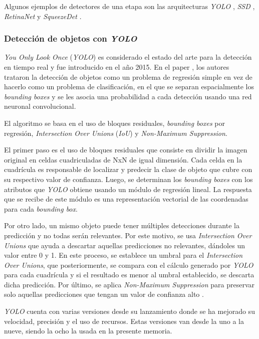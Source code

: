 Algunos ejemplos de detectores de una etapa son las arquitecturas \textit{YOLO} \cite{ARTICLE:13}, \textit{SSD} \cite{ARTICLE:14}, \textit{RetinaNet} \cite{ARTICLE:15} y \textit{SqueezeDet} \cite{ARTICLE:16}. 

\subsubsection{Detección de objetos con \textit{YOLO}}

\textit{You Only Look Once} (\textit{YOLO}) es considerado el estado del arte para la detección en tiempo real y fue introducido en el año 2015. En el paper \cite{ARTICLE:13}, los autores trataron la detección de objetos como un problema de regresión simple en vez de hacerlo como un problema de clasificación, en el que se separan espacialmente los \textit{bounding boxes} y se les asocia una probabilidad a cada detección usando una red neuronal convolucional.

El algoritmo se basa en el uso de bloques residuales, \textit{bounding boxes} por regresión, \textit{Intersection Over Unions} (\textit{IoU}) y \textit{Non-Maximum Suppression}.

El primer paso es el uso de bloques residuales que consiste en dividir la imagen original en celdas cuadriculadas de NxN de igual dimensión. Cada celda en la cuadrícula es responsable de localizar y predecir la clase de objeto que cubre con su respectivo valor de confianza. Luego, se determinan los \textit{bounding boxes} con los atributos que \textit{YOLO} obtiene usando un módulo de regresión lineal. La respuesta que se recibe de este módulo es una representación vectorial de las coordenadas para cada \textit{bounding box}.

Por otro lado, un mismo objeto puede tener múltiples detecciones durante la predicción y no todas serán relevantes. Por este motivo, se usa \textit{Intersection Over Unions} que ayuda a descartar aquellas predicciones no relevantes, dándoles un valor entre 0 y 1. En este proceso, se establece un umbral para el \textit{Intersection Over Unions}, que posteriormente, se compara con el cálculo generado por \textit{YOLO} para cada cuadrícula y si el resultado es menor al umbral establecido, se descarta dicha predicción. Por último, se aplica \textit{Non-Maximum Suppression} para preservar solo aquellas predicciones que tengan un valor de confianza alto \cite{WEBSITE:7}.

\textit{YOLO} cuenta con varias versiones desde su lanzamiento donde se ha mejorado su velocidad, precisión y el uso de recursos. Estas versiones van desde la uno a la nueve, siendo la ocho la usada en la presente memoria.

